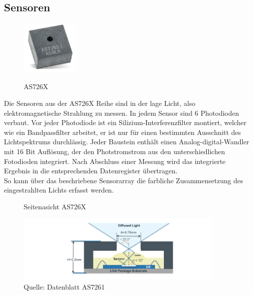 \newpage
\subsection{Sensoren}\label{Sensoren}

\begin{figure}
\centering
\caption{AS726X}
\includegraphics[width=0.25\textwidth]{img/as726X.png}
\label{fig:AS726X}
\end{figure}

Die Sensoren aus der AS726X Reihe sind in der lage Licht, also elektromagnetische Strahlung zu messen. 
In jedem Sensor sind 6 Photodioden verbaut. 
Vor jeder Photodiode ist ein Silizium-Interferenzfilter montiert, welcher wie ein Bandpassfilter arbeitet, er ist nur für einen bestimmten Ausschnitt des Lichtspektrums durchlässig.
Jeder Baustein enthält einen Analog-digital-Wandler mit 16 Bit Auflösung, der den Photstromstrom aus den unterschiedlichen Fotodioden integriert. Nach Abschluss einer Messung wird das integrierte Ergebnis in die entsprechenden Datenregister übertragen.\\
So kann über das beschriebene Sensorarray die farbliche Zusammensetzung des eingestrahlten Lichts erfasst werden.

\begin{figure}[H]
\centering
\caption{Seitenasicht AS726X}
\includegraphics[width=0.9\textwidth]{img/AS726X-seitenansicht.png}
\caption*{Quelle: Datenblatt AS7261}
\label{fig:Seitenasicht-AS726X}
\end{figure}


